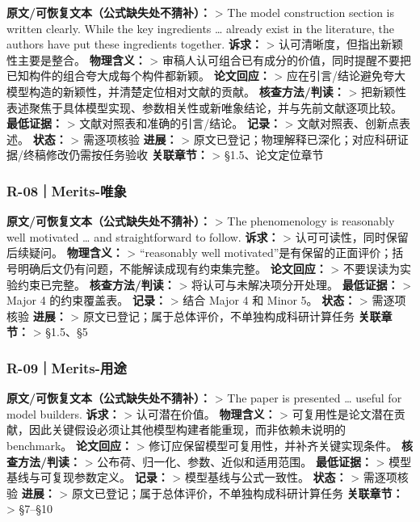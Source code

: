 \documentclass[
  chinese,
  UTF8]{ctexart}
\begin{document}
\textbf{原文/可恢复文本（公式缺失处不猜补）：} \textgreater{} The model
construction section is written clearly. While the key ingredients
\ldots{} already exist in the literature, the authors have put these
ingredients together. \textbf{诉求：} \textgreater{}
认可清晰度，但指出新颖性主要是整合。 \textbf{物理含义：} \textgreater{}
审稿人认可组合已有成分的价值，同时提醒不要把已知构件的组合夸大成每个构件都新颖。
\textbf{论文回应：} \textgreater{}
应在引言/结论避免夸大模型构造的新颖性，并清楚定位相对文献的贡献。
\textbf{核查方法/判读：} \textgreater{}
把新颖性表述聚焦于具体模型实现、参数相关性或新唯象结论，并与先前文献逐项比较。
\textbf{最低证据：} \textgreater{} 文献对照表和准确的引言/结论。
\textbf{记录：} \textgreater{} 文献对照表、创新点表述。 \textbf{状态：}
\textgreater{} 需逐项核验 \textbf{进展：} \textgreater{}
原文已登记；物理解释已深化；对应科研证据/终稿修改仍需按任务验收
\textbf{关联章节：} \textgreater{} §1.5、论文定位章节

\subsubsection{R-08｜Merits-唯象}\label{r-08merits-ux552fux8c61}

\textbf{原文/可恢复文本（公式缺失处不猜补）：} \textgreater{} The
phenomenology is reasonably well motivated \ldots{} and straightforward
to follow. \textbf{诉求：} \textgreater{} 认可可读性，同时保留后续疑问。
\textbf{物理含义：} \textgreater{} ``reasonably well
motivated''是有保留的正面评价；括号明确后文仍有问题，不能解读成现有约束集完整。
\textbf{论文回应：} \textgreater{} 不要误读为实验约束已完整。
\textbf{核查方法/判读：} \textgreater{} 将认可与未解决项分开处理。
\textbf{最低证据：} \textgreater{} Major 4 的约束覆盖表。
\textbf{记录：} \textgreater{} 结合 Major 4 和 Minor 5。 \textbf{状态：}
\textgreater{} 需逐项核验 \textbf{进展：} \textgreater{}
原文已登记；属于总体评价，不单独构成科研计算任务 \textbf{关联章节：}
\textgreater{} §1.5、§5

\subsubsection{R-09｜Merits-用途}\label{r-09merits-ux7528ux9014}

\textbf{原文/可恢复文本（公式缺失处不猜补）：} \textgreater{} The paper
is presented \ldots{} useful for model builders. \textbf{诉求：}
\textgreater{} 认可潜在价值。 \textbf{物理含义：} \textgreater{}
可复用性是论文潜在贡献，因此关键假设必须让其他模型构建者能重现，而非依赖未说明的
benchmark。 \textbf{论文回应：} \textgreater{}
修订应保留模型可复用性，并补齐关键实现条件。 \textbf{核查方法/判读：}
\textgreater{} 公布荷、归一化、参数、近似和适用范围。
\textbf{最低证据：} \textgreater{} 模型基线与可复现参数定义。
\textbf{记录：} \textgreater{} 模型基线与公式一致性。 \textbf{状态：}
\textgreater{} 需逐项核验 \textbf{进展：} \textgreater{}
原文已登记；属于总体评价，不单独构成科研计算任务 \textbf{关联章节：}
\textgreater{} §7--§10
\end{document}
